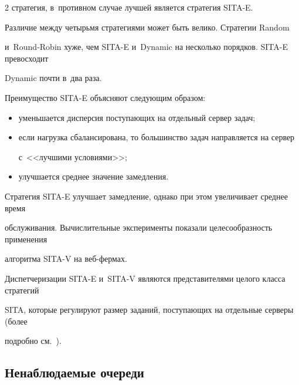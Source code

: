 \begin{multicols}{2}
стратегия, в~противном случае лучшей является стратегия SITA-E.


    


    Различие между четырьмя стратегиями может быть велико. Стратегии Random 


и~Round-Robin хуже, чем SITA-E и~Dynamic на несколько порядков. SITA-E превосходит 


Dynamic почти в~два раза.


    


    Преимущество SITA-E объясняют следующим образом:


    \begin{itemize}


    \item уменьшается дисперсия поступающих на отдельный сервер задач;


    \item если нагрузка сбалансирована, то большинство задач направляется на сервер 


с~<<лучшими условиями>>;


    \item улучшается среднее значение замедления.


    \end{itemize}


    


    Стратегия SITA-E улучшает замедление, однако при этом увеличивает среднее время 


обслуживания. Вычислительные эксперименты показали целесообразность применения 


алгоритма SITA-V на веб-фер\-мах.


    


    Диспетчеризации SITA-E и~SITA-V являются представителями целого класса стратегий 


SITA, которые регулируют размер заданий, поступающих на отдельные серверы (более 


подробно см.~\cite{25-kon, 26-kon}).





\vspace*{-1pt}


   


   \subsection{Ненаблюдаемые очереди}



\end{multicols}
